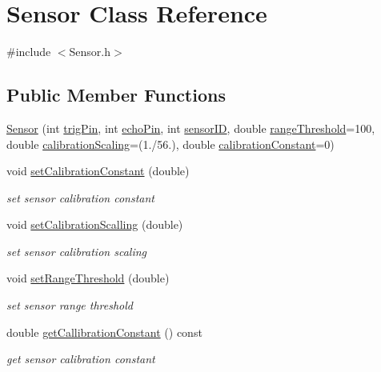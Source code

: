 \hypertarget{class_sensor}{}\section{Sensor Class Reference}
\label{class_sensor}


{\ttfamily \#include $<$Sensor.\+h$>$}

\subsection*{Public Member Functions}
\begin{DoxyCompactItemize}
\item 
\mbox{\hyperlink{class_sensor_a6d678dbc52786bdd392343e2e24b2658}{Sensor}} (int \mbox{\hyperlink{class_sensor_a65af6ba8239b1ba96ef2fcbb1931092f}{trig\+Pin}}, int \mbox{\hyperlink{class_sensor_a7095531fc5ebb17ebddd68e75d45c1fb}{echo\+Pin}}, int \mbox{\hyperlink{class_sensor_acfc8b807b75d929969a2a9ba32ec4d20}{sensor\+ID}}, double \mbox{\hyperlink{class_sensor_a3ef8fe9d533d6b9ca9cfbaba5bc072c4}{range\+Threshold}}=100, double \mbox{\hyperlink{class_sensor_a36d68507776088618b17ed25ac8d018c}{calibration\+Scaling}}=(1./56.), double \mbox{\hyperlink{class_sensor_a370acf36d39381aa3052c84e2d9f8443}{calibration\+Constant}}=0)
\item 
void \mbox{\hyperlink{class_sensor_ad4ef1c3ac7c3ed7427d4337ab3762228}{set\+Calibration\+Constant}} (double)
\begin{DoxyCompactList}\small\item\em set sensor calibration constant \end{DoxyCompactList}\item 
void \mbox{\hyperlink{class_sensor_a662c899f76590071b561eab8f151fdea}{set\+Calibration\+Scalling}} (double)
\begin{DoxyCompactList}\small\item\em set sensor calibration scaling \end{DoxyCompactList}\item 
void \mbox{\hyperlink{class_sensor_a1ed79291c81c8e11cdb369fd895c42cc}{set\+Range\+Threshold}} (double)
\begin{DoxyCompactList}\small\item\em set sensor range threshold \end{DoxyCompactList}\item 
double \mbox{\hyperlink{class_sensor_a715ecf9ba535991cacc7372073ba1355}{get\+Callibration\+Constant}} () const
\begin{DoxyCompactList}\small\item\em get sensor calibration constant \end{DoxyCompactList}\item 

\end{DoxyCompactItemize}
